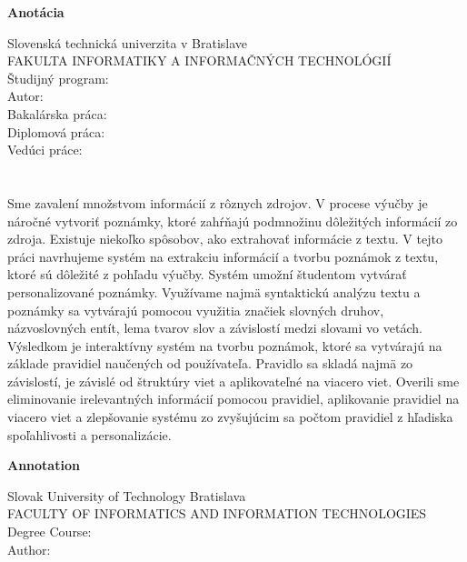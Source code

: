 \newpage
\thispagestyle{plain}
\begin{center}
\begin{Large}
\textbf{Anotácia} \\
\end{Large}
\end{center}
Slovenská technická univerzita v Bratislave \\
FAKULTA INFORMATIKY A INFORMAČNÝCH TECHNOLÓGIÍ \\
\noindent
Študijný program: \Program \\
\noindent
Autor: \Author \\
{
	{Bakalárska práca: }\Title \\
}
{
	{Diplomová práca: }\Title \\
}
Vedúci práce: \Supervisor \\
\Month \Year \\
\noindent
\\
Sme zavalení množstvom informácií z rôznych zdrojov. V procese výučby je náročné vytvoriť poznámky, ktoré zahŕňajú podmnožinu dôležitých informácií zo zdroja. Existuje niekoľko spôsobov, ako extrahovať informácie z textu. V tejto práci navrhujeme systém na extrakciu informácií a tvorbu poznámok z textu, ktoré sú dôležité z pohľadu výučby. Systém umožní študentom vytvárať personalizované poznámky. Využívame najmä syntaktickú analýzu textu a poznámky sa vytvárajú pomocou využitia značiek slovných druhov, názvoslovných entít, lema tvarov slov a závislostí medzi slovami vo vetách. Výsledkom je interaktívny systém na tvorbu poznámok, ktoré sa vytvárajú na základe pravidiel naučených od používateľa. Pravidlo sa skladá najmä zo závislostí, je závislé od štruktúry viet a aplikovateľné na viacero viet. Overili sme eliminovanie irelevantných informácií pomocou pravidiel, aplikovanie pravidiel na viacero viet a zlepšovanie systému zo zvyšujúcim sa počtom pravidiel z hľadiska spoľahlivosti a personalizácie.
\newpage
\thispagestyle{plain}
\begin{center}
\begin{Large}
\textbf{Annotation} \\
\end{Large}
\end{center}
Slovak University of Technology Bratislava \\
FACULTY OF INFORMATICS AND INFORMATION TECHNOLOGIES \\
\noindent
Degree Course: \Program \\
\noindent
Author: \Author \\
